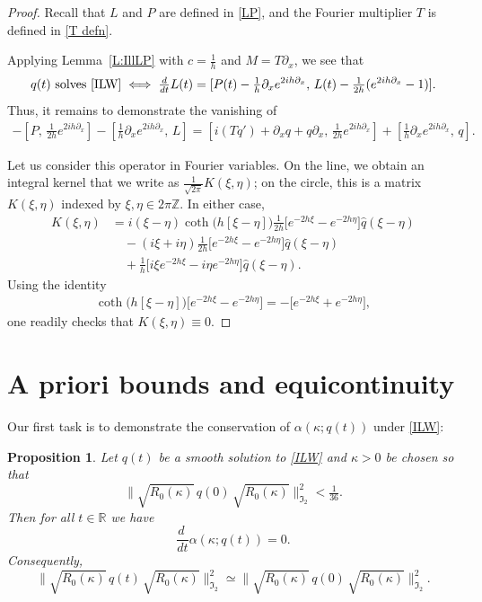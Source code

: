 \documentclass{amsart}
\newcommand{\R}{{\mathbb{R}}}
\newcommand{\Z}{{\mathbb{Z}}}
\newcommand{\ddt}{\frac{d\ }{dt}}
\newtheorem{prop}[theorem]{Proposition}
\theoremstyle{definition}
\theoremstyle{remark}
\begin{document}
\begin{proof} Recall that $L$ and $P$ are defined in \eqref{LP}, and the Fourier multiplier $T$ is defined in \eqref{T defn}.

Applying Lemma~\ref{L:IllLP} with \(c=\frac1h\) and $M=T\partial_x$, we see that 
\begin{equation*}
\text{$q(t)$ solves \eqref{ILW}} \iff \tfrac{d}{dt} L(t) = [P(t)-\tfrac1h\partial_x e^{2ih\partial_x},\, L(t)- \tfrac1{2h}(e^{2ih\partial_x}-1)].  
\end{equation*}
Thus, it remains to demonstrate the vanishing of 
\begin{align*}
 - [P,\, \tfrac1{2h}e^{2ih\partial_x}] - [\tfrac1h\partial_x e^{2ih\partial_x},\, L] = [ i (Tq') + \partial_x q +q\partial_x ,\, \tfrac1{2h}e^{2ih\partial_x}] + [\tfrac1h\partial_x e^{2ih\partial_x},\, q].
\end{align*}

Let us consider this operator in Fourier variables.  On the line, we obtain an integral kernel that we write as $\tfrac{1}{\sqrt{2\pi}}K(\xi,\eta)$; on the circle, this is a matrix $K(\xi,\eta)$ indexed by $\xi,\eta\in2\pi\Z$.  In either case,
\begin{align*}
K(\xi,\eta)&=i(\xi-\eta)\coth\bigl(h[\xi-\eta]\bigr)\tfrac1{2h}\bigl[e^{-2h\xi} - e^{-2h\eta}\bigr] \widehat q (\xi-\eta)\\
&\quad - (i\xi + i\eta) \tfrac1{2h}\bigl[e^{-2h\xi} - e^{-2h\eta}\bigr] \widehat q (\xi-\eta) \\
&\quad + \tfrac1h\bigl[i\xi e^{-2h\xi} - i\eta e^{-2h\eta}\bigr] \widehat q (\xi-\eta).
\end{align*}
Using the identity
\begin{align*}
\coth\bigl(h[\xi-\eta]\bigr)\bigl[e^{-2h\xi} - e^{-2h\eta}\bigr] = - \bigl[ e^{-2h\xi} + e^{-2h\eta}\bigr],
\end{align*}
one readily checks that $K(\xi,\eta)\equiv 0$.
\end{proof}


\section{A priori bounds and equicontinuity}\label{S:3}

Our first task is to demonstrate the conservation of $\alpha(\kappa;q(t))$ under \eqref{ILW}:

\begin{prop}\label{P:cons}
Let $q(t)$ be a smooth solution to \eqref{ILW} and \(\kappa>0\) be chosen so that
\begin{equation}\label{small init}
\| \sqrt{R_0(\kappa)}\, q(0)\, \sqrt{R_0(\kappa)}\|_{\mathfrak I_2}^2<\tfrac1{36}.
\end{equation}
Then for all \(t\in \R\) we have
\begin{equation*}
\ddt \alpha(\kappa;q(t)) = 0.
\end{equation*}
Consequently,
\begin{equation}\label{I2 equiv}
\| \sqrt{R_0(\kappa)}\, q(t)\, \sqrt{R_0(\kappa)}\|_{\mathfrak I_2}^2\simeq \| \sqrt{R_0(\kappa)}\, q(0)\, \sqrt{R_0(\kappa)}\|_{\mathfrak I_2}^2.
\end{equation}
\end{prop}
\end{document}
